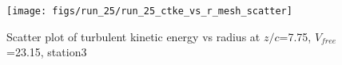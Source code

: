 \begin{figure}[H]
\centering
\texttt{[image: figs/run\_25/run\_25\_ctke\_vs\_r\_mesh\_scatter]}
\caption{Scatter plot of turbulent kinetic energy vs radius at $z/c$=7.75, $V_{free}$=23.15, station3}
\label{fig:run_25_ctke_vs_r_mesh_scatter}
\end{figure}


